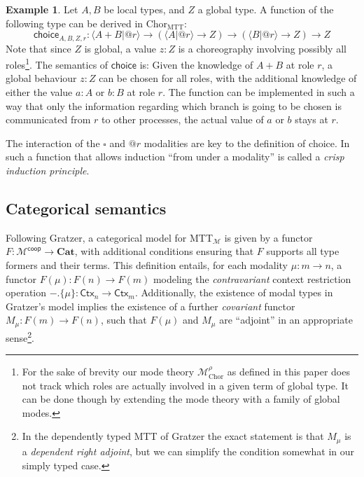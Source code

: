 \documentclass{scrartcl}
\theoremstyle{definition}
\newtheorem{example}{Example}
\theoremstyle{plain}
\newcommand{\ChorMTT}{Chor${}_{\textrm{MTT}}$}
\begin{document}
\begin{example}
  Let $A, B$ be local types, and $Z$ a global type. A function of the following
  type can be derived in \ChorMTT:
  \[
    \textsf{choice}_{A,B,Z,r} : \langle A + B | @r \rangle
    \to (\langle A | @r \rangle \to Z)
    \to (\langle B | @r \rangle \to Z)
    \to Z
  \]
  Note that since $Z$ is global, a value $z : Z$ is a choreography involving
  possibly all roles\footnote{For the sake of brevity our mode theory
    $\mathcal{M}^{\rho}_{\textrm{Chor}}$ as defined in this paper does not track which
    roles are actually involved in a given term of global type. It can be done
    though by extending the mode theory with a family of global modes.}. The semantics
  of $\textsf{choice}$ is: Given the knowledge of $A + B$ at role $r$, a global behaviour
  $z : Z$ can be chosen for all roles, with the additional knowledge of either
  the value $a : A$ or $b : B$ at role $r$. The function can be implemented in
  such a way that only the information regarding which branch is going to be
  chosen is communicated from $r$ to other processes, the actual value of $a$ or
  $b$ stays at $r$.

  The interaction of the $\square$ and $@r$ modalities are key to the definition
  of choice. In \cite{gratzer2023syntax} such a function that allows induction ``from under a
  modality'' is called a \emph{crisp induction principle}.
\end{example}

\subsection{Categorical semantics}
Following Gratzer, a categorical model for MTT$_{\mathcal{M}}$ is given by a
functor $F : \mathcal{M}^{\textsf{coop}} \to \textbf{Cat}$, with additional
conditions ensuring that $F$ supports all type formers and their terms. This
definition entails, for each modality $\mu : m \to n$, a functor
$F(\mu) : F(n) \to F(m)$ modeling the \emph{contravariant} context restriction
operation ${-}.\{\mu\} : \textsf{Ctx}_n \to \textsf{Ctx}_m$. Additionally, the
existence of modal types in Gratzer's model implies the existence of a further
\emph{covariant} functor $M_\mu : F(m) \to F(n)$, such that $F(\mu)$ and
$M_\mu$ are ``adjoint'' in an appropriate sense\footnote{In the dependently
  typed MTT of Gratzer the exact statement is that $M_\mu$ is a
  \emph{dependent right adjoint}, but we can simplify the condition somewhat
  in our simply typed case.}.
\end{document}
